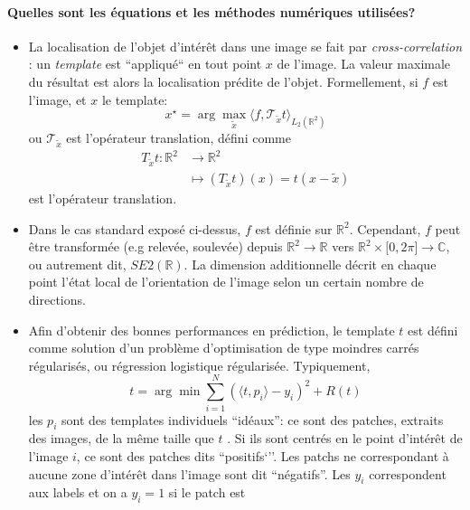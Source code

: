 \documentclass{article}
\begin{document}
\paragraph{Quelles sont les équations et les méthodes numériques utilisées?} 
\begin{itemize}
    \setlength{\itemsep}{0pt}
    \item La localisation de l'objet d'intérêt dans une image se fait par
      \emph{cross-correlation} \cite{cross-correlation}: un
        \emph{template} est ``appliqué`` en tout point $ x $ de l'image.  La valeur
        maximale du résultat est alors la localisation prédite de l'objet. Formellement,
        si $ f $ est l'image, et $ x $ le template:
      \[
      {x}^{\star} = \arg \max_{ \tilde{ x } } \langle  f, \mathcal  T_{ \tilde{ x }}
      t\rangle_{L_2(\mathbb{R}^2)}
      \] 
      ou $ \mathcal  T_{ \tilde{ x }}$  est l'opérateur translation, défini comme
      \[
      \begin{aligned}
        T_{ \tilde{ x }}t:  \mathbb{R}^2 &\longrightarrow \mathbb{R}^2 \\
                                         &\longmapsto \left ( T_{ \tilde{ x }}t \right )(x) = t( x - \tilde{ x })
      \end{aligned}
      \] 
       est l'opérateur translation.
    \item Dans le cas standard exposé ci-dessus, $ f $ est définie sur $ \mathbb{R}^2 $. Cependant, $ f $
        peut être transformée (e.g relevée, soulevée) depuis $ \mathbb{R}^2  \to
        \mathbb{R} $  vers $ \mathbb{R}^2 \times \lbrack 0, 2 \pi \rbrack  \to \mathbb{
        C} $, ou autrement dit, $ SE2(\mathbb{R}) $. La dimension
        additionnelle décrit en chaque point l'état local de l'orientation de l'image
        selon un certain nombre de directions.
    \item Afin d'obtenir des bonnes performances en prédiction, le template $ t $ est
      défini comme solution d'un problème d'optimisation de type
        moindres carrés régularisés, ou régression logistique régularisée.
        Typiquement,
        \[
        t = \arg \min_{  } \sum\limits_{ i=1 }^{ N } \left ( \langle t, p_i \rangle
        - y_i \right )^2 + R(t) 
        \] 
        les $ p_i $ sont des templates individuels ``idéaux'': ce sont des patches,
        extraits des images, de la même taille que $ t $ . Si ils sont centrés en le point d'intérêt
        de l'image $ i $, ce sont des patches dits ``positifs`''. Les patchs ne correspondant à aucune zone d'intérêt 
        dans l'image sont dit ``négatifs''. Les $y_i$ correspondent aux labels et on a $y_i =1$ si le patch est 

\end{itemize}
\end{document}
